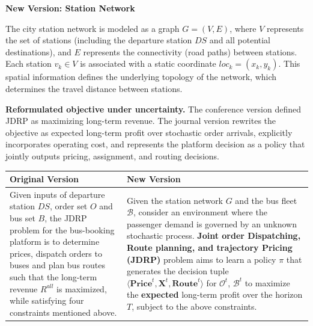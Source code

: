 \documentclass[11pt, a4paper]{article}
\begin{document}
\begin{itemize}
    \begin{boxedminipage}[htbp]{\linewidth}
    \vspace{2mm}
    \noindent \textbf{New Version: Station Network}
    
    The city station network is modeled as a graph $G=(V, E)$, where $V$ represents the set of stations (including the departure station $DS$ and all potential destinations), and $E$ represents the connectivity (road paths) between stations. Each station $v_k \in V$ is associated with a static coordinate $loc_k = (x_k, y_k)$. This spatial information defines the underlying topology of the network, which determines the travel distance between stations.
    \end{boxedminipage}

    \textbf{Reformulated objective under uncertainty.} The conference version defined JDRP as maximizing long-term revenue. The journal version rewrites the objective as expected long-term profit over stochastic order arrivals, explicitly incorporates operating cost, and represents the platform decision as a policy that jointly outputs pricing, assignment, and routing decisions.

    \begin{tabular}{|p{}|p{}|}
        \hline
        \textbf{Original Version} & \textbf{New Version}\\
        \hline
        Given inputs of departure station $DS$, order set $O$ and bus set $B$, the JDRP problem for the bus-booking platform is to determine prices, dispatch orders to buses and plan bus routes such that the long-term revenue $R^{all}$ is maximized, while satisfying four constraints mentioned above. &
        Given the station network $G$ and the bus fleet $\mathcal{B}$, consider an environment where the passenger demand is governed by an unknown stochastic process. \textbf{Joint order Dispatching, Route planning, and trajectory Pricing (JDRP)} problem aims to learn a policy $\pi$ that generates the decision tuple $\langle \mathbf{Price}^t, \mathbf{X}^t, \mathbf{Route}^t \rangle$ for $\mathcal{O}^t$, $\mathcal{B}^t$ to maximize the \textbf{expected} long-term profit over the horizon $T$, subject to the above constraints.\\
        \hline
    \end{tabular}


\end{itemize}
\end{document}
